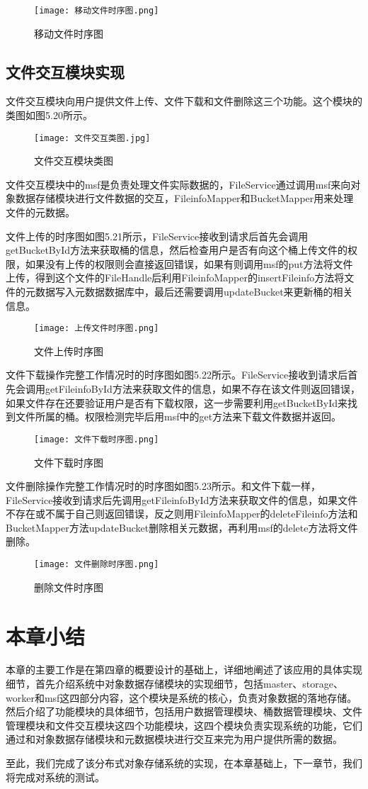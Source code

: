 \begin{figure}
  \centering
  \texttt{[image: 移动文件时序图.png]}
  \caption{移动文件时序图}
\end{figure}

\subsection{文件交互模块实现}
文件交互模块向用户提供文件上传、文件下载和文件删除这三个功能。这个模块的类图如图5.20所示。

\begin{figure}
  \centering
  \texttt{[image: 文件交互类图.jpg]}
  \caption{文件交互模块类图}
\end{figure}

文件交互模块中的msf是负责处理文件实际数据的，FileService通过调用msf来向对象数据存储模块进行文件数据的交互，FileinfoMapper和BucketMapper用来处理文件的元数据。

文件上传的时序图如图5.21所示，FileService接收到请求后首先会调用getBucketById方法来获取桶的信息，然后检查用户是否有向这个桶上传文件的权限，如果没有上传的权限则会直接返回错误，如果有则调用msf的put方法将文件上传，得到这个文件的FileHandle后利用FileinfoMapper的insertFileinfo方法将文件的元数据写入元数据数据库中，最后还需要调用updateBucket来更新桶的相关信息。

\begin{figure}
  \centering
  \texttt{[image: 上传文件时序图.png]}
  \caption{文件上传时序图}
\end{figure}

文件下载操作完整工作情况时的时序图如图5.22所示。FileService接收到请求后首先会调用getFileinfoById方法来获取文件的信息，如果不存在该文件则返回错误，如果文件存在还要验证用户是否有下载权限，这一步需要利用getBucketById来找到文件所属的桶。权限检测完毕后用msf中的get方法来下载文件数据并返回。

\begin{figure}
  \centering
  \texttt{[image: 文件下载时序图.png]}
  \caption{文件下载时序图}
\end{figure}

文件删除操作完整工作情况时的时序图如图5.23所示。和文件下载一样，FileService接收到请求后先调用getFileinfoById方法来获取文件的信息，如果文件不存在或不属于自己则返回错误，反之则用FileinfoMapper的deleteFileinfo方法和BucketMapper方法updateBucket删除相关元数据，再利用msf的delete方法将文件删除。

\begin{figure}
  \centering
  \texttt{[image: 文件删除时序图.png]}
  \caption{删除文件时序图}
\end{figure}

\section{本章小结}%
本章的主要工作是在第四章的概要设计的基础上，详细地阐述了该应用的具体实现细节，首先介绍系统中对象数据存储模块的实现细节，包括master、storage、worker和msf这四部分内容，这个模块是系统的核心，负责对象数据的落地存储。然后介绍了功能模块的具体细节，包括用户数据管理模块、桶数据管理模块、文件管理模块和文件交互模块这四个功能模块，这四个模块负责实现系统的功能，它们通过和对象数据存储模块和元数据模块进行交互来完为用户提供所需的数据。

至此，我们完成了该分布式对象存储系统的实现，在本章基础上，下一章节，我们将完成对系统的测试。 
